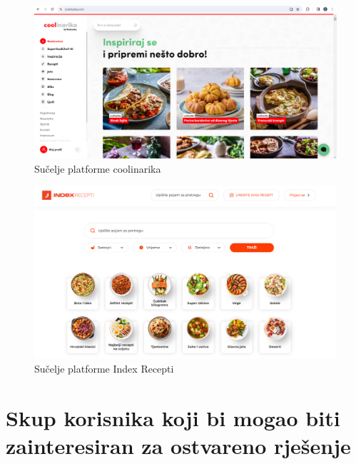 				\begin{figure}[H]
			\includegraphics[scale=0.4]{slike/coolinarika.PNG} %
			\centering
			\caption{Sučelje platforme coolinarika}
			\label{coolinarika}
		\end{figure}
	
		\begin{figure}[H]
			\includegraphics[scale=0.4]{slike/indexRecepti.PNG} %
			\centering
			\caption{Sučelje platforme Index Recepti}
			\label{indexRecepti}
		\end{figure}
		
		\section{Skup korisnika koji bi mogao biti zainteresiran za ostvareno rješenje}
		
